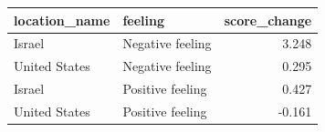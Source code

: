 \begin{tabular}{llr}
\toprule
location\_name & feeling & score\_change \\
\midrule
Israel & Negative feeling & 3.248 \\
United States & Negative feeling & 0.295 \\
Israel & Positive feeling & 0.427 \\
United States & Positive feeling & -0.161 \\
\bottomrule
\end{tabular}
